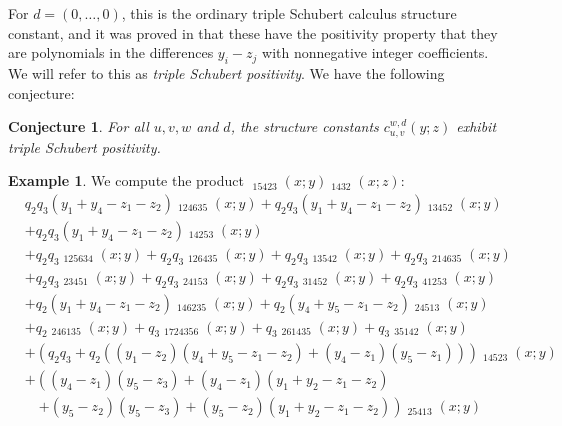 \documentclass{amsart}
\newtheorem{conjecture}[lemma]{Conjecture}
\theoremstyle{definition}
\newtheorem{example}[lemma]{Example}
\theoremstyle{remark}
\numberwithin{equation}{section}
\DeclareMathOperator{\qsch}{\widetilde{\mathfrak{S}}}
\begin{document}
For $d=(0,\ldots,0)$, this is the ordinary triple Schubert calculus structure constant, and it was proved in \cite{gao2025grahampositivitytripleschubert} that these have the positivity property that they are polynomials in the differences $y_i-z_j$ with nonnegative integer coefficients. We will refer to this as \emph{triple Schubert positivity}. We have the following conjecture:
\begin{conjecture}
For all $u,v,w$ and $d$, the structure constants $c_{u,v}^{w,d}(y;z)$ exhibit triple Schubert positivity.
\end{conjecture}

\begin{example} \label{example:cppfpos}
	We compute the product $\qsch_{15423}(x;y)\qsch_{1432}(x;z)$:
\begin{align*}
&q_{2} q_{3} \left(y_{1} + y_{4} - z_{1} - z_{2}\right) \qsch_{124635}{\left(x; y \right)} + q_{2} q_{3} \left(y_{1} + y_{4} - z_{1} - z_{2}\right) \qsch_{13452}{\left(x; y \right)} \\
&+ q_{2} q_{3} \left(y_{1} + y_{4} - z_{1} - z_{2}\right) \qsch_{14253}{\left(x; y \right)} \\
&+ q_{2} q_{3} \qsch_{125634}{\left(x; y \right)} + q_{2} q_{3} \qsch_{126435}{\left(x; y \right)} + q_{2} q_{3} \qsch_{13542}{\left(x; y \right)} + q_{2} q_{3} \qsch_{214635}{\left(x; y \right)} \\
&+ q_{2} q_{3} \qsch_{23451}{\left(x; y \right)} + q_{2} q_{3} \qsch_{24153}{\left(x; y \right)} + q_{2} q_{3} \qsch_{31452}{\left(x; y \right)} + q_{2} q_{3} \qsch_{41253}{\left(x; y \right)} \\
&+ q_{2} \left(y_{1} + y_{4} - z_{1} - z_{2}\right) \qsch_{146235}{\left(x; y \right)} + q_{2} \left(y_{4} + y_{5} - z_{1} - z_{2}\right) \qsch_{24513}{\left(x; y \right)} \\
&+ q_{2} \qsch_{246135}{\left(x; y \right)} + q_{3} \qsch_{1724356}{\left(x; y \right)} + q_{3} \qsch_{261435}{\left(x; y \right)} + q_{3} \qsch_{35142}{\left(x; y \right)} \\
&+ \left(q_{2} q_{3} + q_{2} \left(\left(y_{1} - z_{2}\right) \left(y_{4} + y_{5} - z_{1} - z_{2}\right) + \left(y_{4} - z_{1}\right) \left(y_{5} - z_{1}\right)\right)\right) \qsch_{14523}{\left(x; y \right)} \\
&+ \left(\left(y_{4} - z_{1}\right) \left(y_{5} - z_{3}\right) + \left(y_{4} - z_{1}\right) \left(y_{1} + y_{2} - z_{1} - z_{2}\right) \right. \\
&\quad \left. + \left(y_{5} - z_{2}\right) \left(y_{5} - z_{3}\right) + \left(y_{5} - z_{2}\right) \left(y_{1} + y_{2} - z_{1} - z_{2}\right)\right) \qsch_{25413}{\left(x; y \right)} \\

\end{align*}
\end{example}
\end{document}
